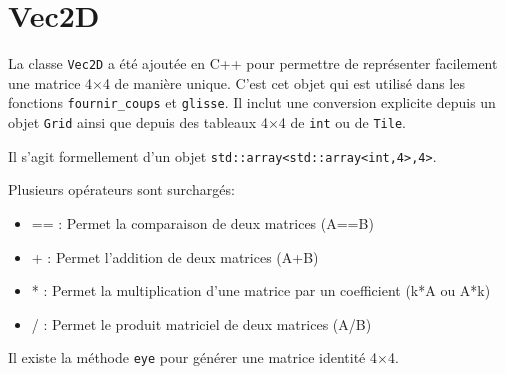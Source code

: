 \documentclass[a4paper]{report}
\begin{document}
\section{Vec2D}
La classe \verb|Vec2D| a été ajoutée en C++ pour permettre de représenter facilement une matrice 4$\times$4 de manière unique. C'est cet objet qui est utilisé dans les fonctions \verb|fournir_coups| et \verb|glisse|. Il inclut une conversion explicite depuis un objet \verb|Grid| ainsi que depuis des tableaux 4$\times$4 de \verb|int| ou de \verb|Tile|.

Il s'agit formellement d'un objet \verb|std::array<std::array<int,4>,4>|.

Plusieurs opérateurs sont surchargés:
\begin{itemize}
\item == : Permet la comparaison de deux matrices (A==B)
\item + : Permet l'addition de deux matrices (A+B)
\item * : Permet la multiplication d'une matrice par un coefficient (k*A ou A*k)
\item / : Permet le produit matriciel de deux matrices (A/B)
\end{itemize}

Il existe la méthode \verb|eye| pour générer une matrice identité 4$\times$4.

















\tableofcontents
\lstlistoflistings
\end{document}
